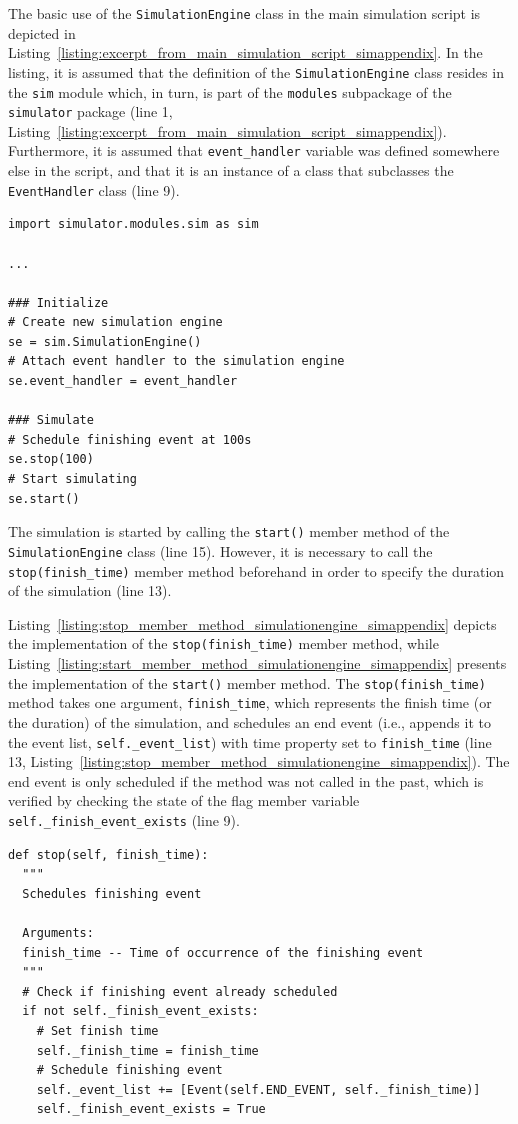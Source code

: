 The basic use of the \lstinline{SimulationEngine} class in the main simulation script is depicted in Listing~\ref{listing:excerpt_from_main_simulation_script_simappendix}. In the listing, it is assumed that the definition of the \lstinline{SimulationEngine} class resides in the \lstinline{sim} module which, in turn, is part of the \lstinline{modules} subpackage of the \lstinline{simulator} package (line 1, Listing~\ref{listing:excerpt_from_main_simulation_script_simappendix}). Furthermore, it is assumed that \lstinline{event_handler} variable was defined somewhere else in the script, and that it is an instance of a class that subclasses the \lstinline{EventHandler} class (line 9).
\begin{lstlisting}[caption=Excerpt from main simulation script, label=listing:excerpt_from_main_simulation_script_simappendix]
import simulator.modules.sim as sim

...

### Initialize
# Create new simulation engine
se = sim.SimulationEngine()
# Attach event handler to the simulation engine
se.event_handler = event_handler

### Simulate
# Schedule finishing event at 100s
se.stop(100)
# Start simulating
se.start()
\end{lstlisting}
The simulation is started by calling the \lstinline{start()} member method of the \lstinline{SimulationEngine} class (line 15). However, it is necessary to call the \lstinline{stop(finish_time)} member method beforehand in order to specify the duration of the simulation (line 13).

Listing~\ref{listing:stop_member_method_simulationengine_simappendix} depicts the implementation of the \lstinline{stop(finish_time)} member method, while Listing~\ref{listing:start_member_method_simulationengine_simappendix} presents the implementation of the \lstinline{start()} member method. The \lstinline{stop(finish_time)} method takes one argument, \lstinline{finish_time}, which represents the finish time (or the duration) of the simulation, and schedules an end event (i.e., appends it to the event list, \lstinline{self._event_list}) with time property set to \lstinline{finish_time} (line 13, Listing~\ref{listing:stop_member_method_simulationengine_simappendix}). The end event is only scheduled if the method was not called in the past, which is verified by checking the state of the flag member variable \lstinline{self._finish_event_exists} (line 9).

\begin{lstlisting}[caption=\lstinline{stop(finish_time)} member method of the \lstinline{SimulationEngine} class, label=listing:stop_member_method_simulationengine_simappendix]
def stop(self, finish_time):
  """
  Schedules finishing event

  Arguments:
  finish_time -- Time of occurrence of the finishing event
  """
  # Check if finishing event already scheduled
  if not self._finish_event_exists:
    # Set finish time
    self._finish_time = finish_time
    # Schedule finishing event
    self._event_list += [Event(self.END_EVENT, self._finish_time)]
    self._finish_event_exists = True
\end{lstlisting}

